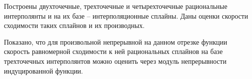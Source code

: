 Построены двухточечные, трехточечные и четырехточечные рациональные интерполянты и на их базе --
интерполяционные сплайны.
Даны оценки скорости сходимости таких сплайнов и их производных.

Показано, что для произвольной непрерывной на данном отрезке функции  скорость равномерной
сходимости к ней    рациональных сплайнов на базе трехточечных интерполянтов можно оценить
через модуль непрерывности индуцированной функции.





%
%
%


